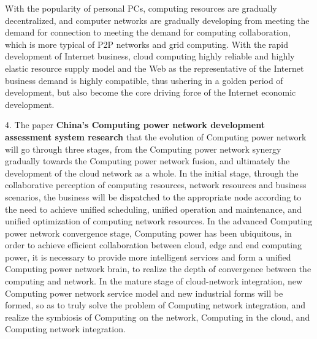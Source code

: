 \documentclass[a4paper,twoside]{scrbook}
\begin{document}
\begin{CJK}{UTF8}{gbsn}
With the popularity of personal PCs, computing resources are gradually decentralized, and computer networks are gradually developing from meeting the demand for connection to meeting the demand for computing collaboration, which is more typical of P2P networks and grid computing. With the rapid development of Internet business, cloud computing highly reliable and highly elastic resource supply model and the Web as the representative of the Internet business demand is highly compatible, thus ushering in a golden period of development, but also become the core driving force of the Internet economic development.


4. The paper \textbf {China's Computing power network development assessment system research}\cite{DXWJ202305004} that the evolution of Computing power network will go through three stages, from the Computing power network synergy gradually towards the Computing power network fusion, and ultimately the development of the cloud network as a whole. In the initial stage, through the collaborative perception of computing resources, network resources and business scenarios, the business will be dispatched to the appropriate node according to the need to achieve unified scheduling, unified operation and maintenance, and unified optimization of computing network resources. In the advanced Computing power network convergence stage, Computing power has been ubiquitous, in order to achieve efficient collaboration between cloud, edge and end computing power, it is necessary to provide more intelligent services and form a unified Computing power network brain, to realize the depth of convergence between the computing and network. In the mature stage of cloud-network integration, new Computing power network service model and new industrial forms will be formed, so as to truly solve the problem of Computing network integration, and realize the symbiosis of Computing on the network, Computing in the cloud, and Computing network integration.


\end{CJK}
\end{document}
